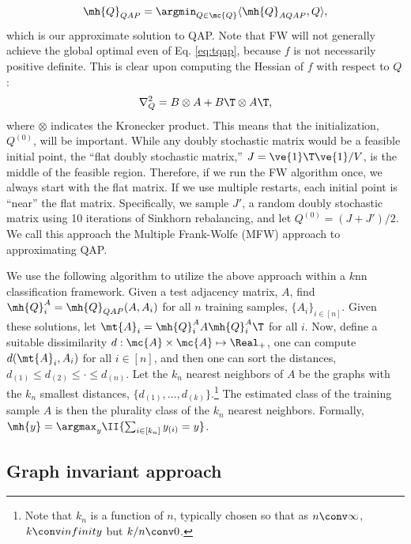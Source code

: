 \begin{align}
	\mh{Q}_{QAP} = \argmin_{Q \in \mc{Q}} \langle \mh{Q}_{AQAP}, Q \rangle,
\end{align}
which is our approximate solution to QAP.  Note that FW will not generally achieve the global optimal even of Eq. \eqref{eq:tqap}, because $f$ is not necessarily positive definite.  This is clear upon computing the Hessian of $f$  with respect to $Q$:
\begin{align}
	\nabla_Q^2  =  B \otimes A + B\T \otimes A\T,
\end{align}
where $\otimes$ indicates the Kronecker product. This means that the initialization, $Q^{(0)}$, will be important.  While any doubly stochastic matrix would be a feasible initial point,  the ``flat doubly  stochastic matrix,'' $J=\ve{1}\T \ve{1}/V$, is the middle of the feasible region.  Therefore, if we run the FW algorithm once, we always start with the flat matrix.  If we use multiple restarts, each initial point is ``near'' the flat matrix.  Specifically, we sample $J'$, a random doubly stochastic matrix using 10 iterations of Sinkhorn rebalancing, and let $Q^{(0)}=(J+J')/2$.  We call this approach the Multiple Frank-Wolfe (MFW) approach to approximating QAP.

We use the following algorithm to utilize the above approach within a $k$nn classification framework.  Given a test adjacency matrix, $A$, find $\mh{Q}_i^A=\mh{Q}_{QAP}(A,A_i)$ for all $n$ training samples, $\{A_i\}_{i \in [n]}$.  Given these solutions, let $\mt{A}_i=\mh{Q}_i^A A {\mh{Q}_i^A}{}\T$ for all $i$. Now, define a suitable dissimilarity $d: \mc{A} \times \mc{A} \mapsto \Real_+$, one can compute $d(\mt{A}_i,A_i)$ for all $i \in [n]$, and then one can sort the distances, $d_{(1)} \leq d_{(2)} \leq \cdot \leq d_{(n)}$.  Let the $k_n$ nearest neighbors of $A$ be the graphs with the $k_n$ smallest distances, $\{d_{(1)},\ldots, d_{(k)}\}$.\footnote{Note that $k_n$ is a function of $n$, typically chosen so that as $n \conv \infty$, $k \conv infinity$ but $k/n \conv 0$.}  The estimated class of the training sample $A$ is then the plurality class of the $k_n$ nearest neighbors.  Formally, $\mh{y}=\argmax_{y} \II\{\sum_{i \in [k_n]} y_{(i)} = y \}$.




\subsection{Graph invariant approach} %
\label{sub:graph_invariant_approach}


